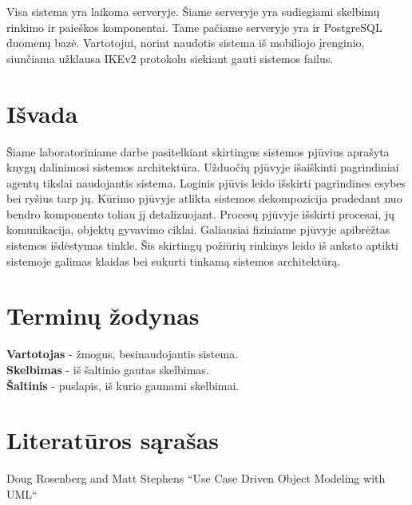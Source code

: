 \documentclass[12pt]{article}
\begin{document}
	Visa sistema yra laikoma serveryje. Šiame serveryje yra sudiegiami skelbimų rinkimo ir paieškos komponentai. Tame pačiame serveryje yra ir PostgreSQL duomenų bazė. Vartotojui, norint naudotis sistema iš mobiliojo įrenginio, siunčiama užklausa IKEv2 protokolu siekiant gauti sistemos failus.
	\pagebreak
	
	
	\section*{Išvada}
	Šiame laboratoriniame darbe pasitelkiant skirtingus sistemos pjūvius aprašyta knygų dalinimosi sistemos architektūra. Užduočių pjūvyje išaiškinti pagrindiniai agentų tikslai naudojantis sistema. Loginis pjūvis leido išskirti pagrindines esybes bei ryšius tarp jų. Kūrimo pjūvyje atlikta sistemos dekompozicija pradedant nuo bendro komponento toliau jį detalizuojant. Procesų pjūvyje išskirti procesai, jų komunikacija, objektų gyvavimo ciklai. Galiausiai fiziniame pjūvyje apibrėžtas sistemos išdėstymas tinkle. Šis skirtingų požiūrių rinkinys leido iš anksto aptikti sistemoje galimas klaidas bei sukurti tinkamą sistemos architektūrą.
	\pagebreak

	\section*{Terminų žodynas}
	
	\bigskip
	\textbf{Vartotojas} - žmogus, besinaudojantis sistema.\\
	
	\textbf{Skelbimas} - iš šaltinio gautas skelbimas.\\
	
	\textbf{Šaltinis} - puslapis, iš kurio gaunami skelbimai.\\
	\pagebreak

	\section*{Literatūros sąrašas}
	
	Doug Rosenberg and Matt Stephens “Use Case Driven Object Modeling with UML“
\end{document}
